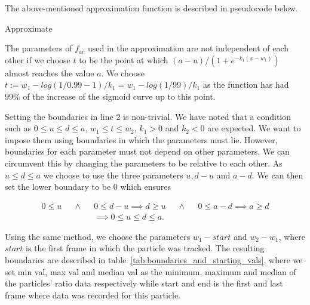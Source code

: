 The above-mentioned approximation function is described in pseudocode below.

\begin{algorithm}[H] \label{alg:approximate}
	\SetAlgoLined
	\DontPrintSemicolon
	\LinesNumbered
	\caption{Approximate}
	
	
	\BlankLine
\end{algorithm}
\vspace{1cm}

The parameters of $f_{ac}$ used in the approximation are not independent of each other if we choose $t$ to be the point at which $(a-u)/(1+e^{-k_1(x-w_1)})$ almost reaches the value $a$. We choose $t := w_1 - log(1/0.99-1) / k_1 = w_1 - log(1/99) / k_1$ as the function has had $99\%$ of the increase of the sigmoid curve up to this point.

Setting the boundaries in line 2 is non-trivial. We have noted that a condition such as $0 \leq u \leq d \leq a$, $w_1 \leq t \leq w_2$, $k_1 > 0$ and $k_2 < 0$ are expected. We want to impose them using boundaries in which the parameters must lie. However, boundaries for each parameter must not depend on other parameters. We can circumvent this by changing the parameters to be relative to each other. As $u \leq d \leq a$ we choose to use the three parameters $u, d-u$ and $a-d$. We can then set the lower boundary to be $0$ which ensures

\begin{align*}
	0 \leq u &&\land &&0 \leq d - u \implies d \geq u &&\land &&0 \leq a - d \implies a \geq d\\
	&& &&\implies 0 \leq u \leq d \leq a.
\end{align*}

Using the same method, we choose the parameters $w_1 - start$ and $w_2 - w_1$, where $start$ is the first frame in which the particle was tracked. The resulting boundaries are described in table~\ref{tab:boundaries_and_starting_vals}, where we set min val, max val and median val as the minimum, maximum and median of the particles' ratio data respectively while start and end is the first and last frame where data was recorded for this particle.

